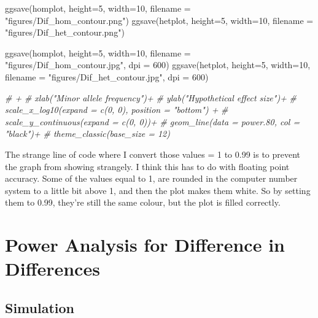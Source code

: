 \documentclass[
]{article}
\newenvironment{Shaded}{\begin{snugshade}}{\end{snugshade}}
\newcommand{\AttributeTok}[1]{\textcolor[rgb]{0.77,0.63,0.00}{#1}}
\newcommand{\CommentTok}[1]{\textcolor[rgb]{0.56,0.35,0.01}{\textit{#1}}}
\newcommand{\DecValTok}[1]{\textcolor[rgb]{0.00,0.00,0.81}{#1}}
\newcommand{\FunctionTok}[1]{\textcolor[rgb]{0.00,0.00,0.00}{#1}}
\newcommand{\NormalTok}[1]{#1}
\newcommand{\StringTok}[1]{\textcolor[rgb]{0.31,0.60,0.02}{#1}}
\begin{document}
\begin{Shaded}
\begin{Highlighting}[]
\FunctionTok{ggsave}\NormalTok{(homplot, }\AttributeTok{height=}\DecValTok{5}\NormalTok{, }\AttributeTok{width=}\DecValTok{10}\NormalTok{, }\AttributeTok{filename =} \StringTok{"figures/Dif\_hom\_contour.png"}\NormalTok{)}
\FunctionTok{ggsave}\NormalTok{(hetplot, }\AttributeTok{height=}\DecValTok{5}\NormalTok{, }\AttributeTok{width=}\DecValTok{10}\NormalTok{, }\AttributeTok{filename =} \StringTok{"figures/Dif\_het\_contour.png"}\NormalTok{)}

\FunctionTok{ggsave}\NormalTok{(homplot, }\AttributeTok{height=}\DecValTok{5}\NormalTok{, }\AttributeTok{width=}\DecValTok{10}\NormalTok{, }\AttributeTok{filename =} \StringTok{"figures/Dif\_hom\_contour.jpg"}\NormalTok{, }
       \AttributeTok{dpi =} \DecValTok{600}\NormalTok{)}
\FunctionTok{ggsave}\NormalTok{(hetplot, }\AttributeTok{height=}\DecValTok{5}\NormalTok{, }\AttributeTok{width=}\DecValTok{10}\NormalTok{, }\AttributeTok{filename =} \StringTok{"figures/Dif\_het\_contour.jpg"}\NormalTok{, }
       \AttributeTok{dpi =} \DecValTok{600}\NormalTok{)}

\CommentTok{\# +}
\CommentTok{\#   xlab("Minor allele frequency")+}
\CommentTok{\#   ylab("Hypothetical effect size")+}
\CommentTok{\#   scale\_x\_log10(expand = c(0, 0), position = "bottom") +}
\CommentTok{\#   scale\_y\_continuous(expand = c(0, 0))+}
\CommentTok{\#   geom\_line(data = power.80, col = "black")+}
\CommentTok{\#   theme\_classic(base\_size = 12)}
\end{Highlighting}
\end{Shaded}

The strange line of code where I convert those values = 1 to 0.99 is to
prevent the graph from showing strangely. I think this has to do with
floating point accuracy. Some of the values equal to 1, are rounded in
the computer number system to a little bit above 1, and then the plot
makes them white. So by setting them to 0.99, they're still the same
colour, but the plot is filled correctly.

\hypertarget{power-analysis-for-difference-in-differences}{%
\section{Power Analysis for Difference in
Differences}\label{power-analysis-for-difference-in-differences}}

\hypertarget{simulation-1}{%
\subsection{Simulation}\label{simulation-1}}
\end{document}
